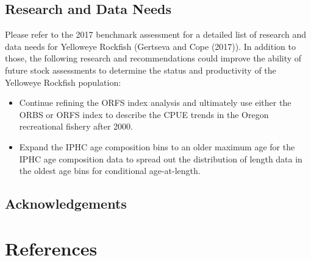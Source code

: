 \documentclass[
]{scrartcl}
\providecommand{\tightlist}{%
  \setlength{\itemsep}{0pt}\setlength{\parskip}{0pt}}\usepackage{longtable,booktabs,array}
\begin{document}
\subsection{Research and Data Needs}\label{research-and-data-needs-1}

Please refer to the 2017 benchmark assessment for a detailed list of
research and data needs for Yelloweye Rockfish (Gertseva and Cope
(2017)). In addition to those, the following research and
recommendations could improve the ability of future stock assessments to
determine the status and productivity of the Yelloweye Rockfish
population:

\begin{itemize}
\tightlist
\item
  Continue refining the ORFS index analysis and ultimately use either
  the ORBS or ORFS index to describe the CPUE trends in the Oregon
  recreational fishery after 2000.
\item
  Expand the IPHC age composition bins to an older maximum age for the
  IPHC age composition data to spread out the distribution of length
  data in the oldest age bins for conditional age-at-length.
\end{itemize}

\newpage{}

\subsection{Acknowledgements}\label{sec-acknowledgements}

\newpage{}

\section{References}\label{references}
\end{document}
